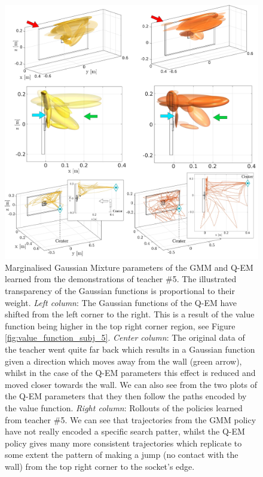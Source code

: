 \documentclass[final,3p,times,twocolumn]{elsarticle}
\begin{document}
 \begin{figure}
    \centering
    \includegraphics[width=\textwidth]{./Figures/Fig/gmm_v2c.pdf}
    \caption{Marginalised Gaussian Mixture parameters of the GMM and Q-EM learned from the demonstrations of teacher \#5. 
    The illustrated transparency of the Gaussian functions is proportional to their weight.
    \textit{Left column}: The Gaussian functions of the Q-EM have shifted from the left corner to the right. This is a result of the value function 
    being higher in the top right corner region, see Figure \ref{fig:value_function_subj_5}. \textit{Center column}:  The original data of the teacher 
    went quite far back which results in a Gaussian function given a direction which moves away from the wall (green arrow), whilst in the case
    of the Q-EM parameters this effect is reduced and moved closer towards the wall.  We can also see from the two plots of the Q-EM parameters 
    that they then follow the paths encoded by the value function.    
    \textit{Right column}: Rollouts of the policies learned from teacher \#5. We can see that trajectories from the GMM policy have not really 
    encoded a specific search patter, whilst the Q-EM policy gives many more consistent trajectories which replicate to some extent 
    the pattern of making a jump (no contact with the wall) from the top right corner to the socket's edge.}
    \label{fig:gmm_exp4}
\end{figure}
 
\end{document}

